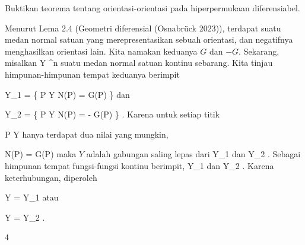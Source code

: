 {

Buktikan teorema tentang orientasi-orientasi pada hiperpermukaan diferensiabel.

}
{

Menurut
Lema 2.4 (Geometri diferensial (Osnabrück 2023)),
terdapat suatu medan normal satuan yang merepresentasikan sebuah orientasi, dan negatifnya menghasilkan orientasi lain. Kita namakan keduanya $G$ dan $-G$. Sekarang, misalkan
 { Y } { \R^n
} {}
suatu medan normal satuan kontinu sebarang. Kita tinjau himpunan-himpunan tempat keduanya berimpit

\mavergleichskettedisp
{\vergleichskette
{ Y_1
}
{ =} { \left\{ P \in Y  \mid   N(P) = G(P)         \right\}
}
{ } {
}
{ } {
}
{ } {
}
}
{}{}{}
dan

\mavergleichskettedisp
{\vergleichskette
{ Y_2
}
{ =} { \left\{ P \in Y  \mid   N(P) = - G(P)         \right\}
}
{ } {
}
{ } {
}
{ } {
}
}
{}{}{.}
Karena untuk setiap titik

\mavergleichskette
{\vergleichskette
{ P
}
{ \in }{ Y
}
{  }{
}
{    }{
}
{   }{
}
}
{}{}{}
hanya terdapat dua nilai yang mungkin,

\mavergleichskettedisp
{\vergleichskette
{ N(P)
}
{ =} { \pm G(P)
}
{ } {
}
{ } {
}
{ } {
}
}
{}{}{}
maka $Y$ adalah gabungan saling lepas dari
\mathkor {} {Y_1} {dan} {Y_2} {.}
Sebagai himpunan tempat fungsi-fungsi kontinu berimpit,
\mathkor {} {Y_1} {dan} {Y_2} {}
 {} {.}
Karena keterhubungan, diperoleh

\mavergleichskette
{\vergleichskette
{ Y
}
{ = }{ Y_1
}
{  }{
}
{    }{
}
{   }{
}
}
{}{}{}
atau

\mavergleichskette
{\vergleichskette
{ Y
}
{ = }{ Y_2
}
{  }{
}
{    }{
}
{   }{
}
}
{}{}{.}

 }



{4}

